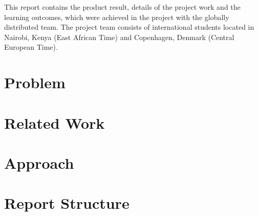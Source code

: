 This report contains the product result, details of the project work and the learning outcomes, which were achieved in the project with the globally distributed team. The project team consists of international students located in Nairobi, Kenya (East African Time) and Copenhagen, Denmark (Central European Time).


\section{Problem}




\section{Related Work}




\section{Approach}




\section{Report Structure}

